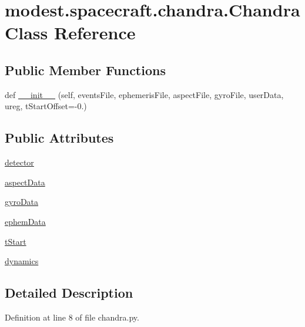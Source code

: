 \hypertarget{classmodest_1_1spacecraft_1_1chandra_1_1Chandra}{}\section{modest.\+spacecraft.\+chandra.\+Chandra Class Reference}
\label{classmodest_1_1spacecraft_1_1chandra_1_1Chandra}
\subsection*{Public Member Functions}
\begin{DoxyCompactItemize}
\item 
def \hyperlink{classmodest_1_1spacecraft_1_1chandra_1_1Chandra_aed18c770b4ea3b2c4e37d60199a6ef02}{\+\_\+\+\_\+init\+\_\+\+\_\+} (self, events\+File, ephemeris\+File, aspect\+File, gyro\+File, user\+Data, ureg, t\+Start\+Offset=-\/0.)
\end{DoxyCompactItemize}
\subsection*{Public Attributes}
\begin{DoxyCompactItemize}
\item 
\hyperlink{classmodest_1_1spacecraft_1_1chandra_1_1Chandra_aff4dd4f943d4b0dcafd9d2f894accbb4}{detector}
\item 
\hyperlink{classmodest_1_1spacecraft_1_1chandra_1_1Chandra_af6f4c5308431c32943cc592c8346ecd7}{aspect\+Data}
\item 
\hyperlink{classmodest_1_1spacecraft_1_1chandra_1_1Chandra_a36ed104ae479e208b38458de53ed5d02}{gyro\+Data}
\item 
\hyperlink{classmodest_1_1spacecraft_1_1chandra_1_1Chandra_a6157130227b1be71b55cc53b9b477fcd}{ephem\+Data}
\item 
\hyperlink{classmodest_1_1spacecraft_1_1chandra_1_1Chandra_aacf53cc2a851ca6597e8fcbca16b2b9a}{t\+Start}
\item 
\hyperlink{classmodest_1_1spacecraft_1_1chandra_1_1Chandra_a512fc9678fa06febebd872b6654f34a1}{dynamics}
\end{DoxyCompactItemize}


\subsection{Detailed Description}


Definition at line 8 of file chandra.\+py.



